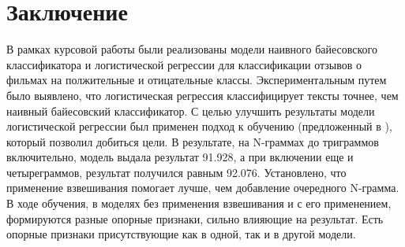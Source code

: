 \chapter{Заключение}
В рамках курсовой работы были реализованы модели наивного байесовского классификатора и логистической регрессии для классификации отзывов о фильмах на полжительные и отицательные классы. Экспериментальным путем было выявлено, что логистическая регрессия классифицирует тексты точнее, чем наивный байесовский классификатор. С целью улучшить результаты модели логистической регрессии был применен подход к обучению (предложенный в \cite{nbsvm}), который позволил добиться цели. В результате, на N-граммах до триграммов включительно, модель выдала результат 91.928, а при включении еще и четыреграммов, результат получился равным 92.076. Установлено, что применение взвешивания помогает лучше, чем добавление очередного N-грамма. В ходе обучения, в моделях без применения взвешивания и с его применением, формируются разные опорные признаки, сильно влияющие на результат. Есть опорные признаки присутствующие как в одной, так и в другой модели.